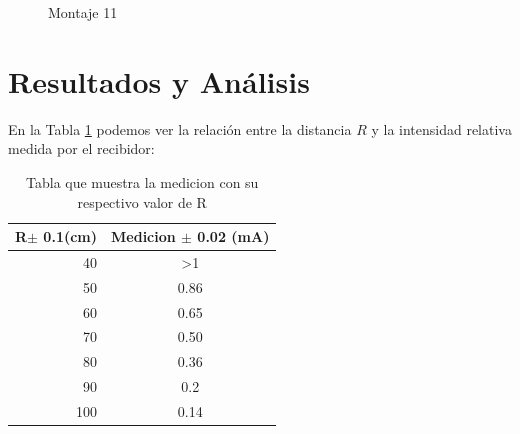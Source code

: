 \documentclass[aps,prl,reprint]{revtex4-1}
\begin{document}
\begin{figure}[H]
\begin{center}
 \caption{Montaje 11}
 \label{exp11}
 \end{center}
\end{figure}

\section{Resultados y An\'alisis}
En la Tabla \ref{tbmonta1.1} podemos ver la relación entre la distancia $R$ y la intensidad relativa medida por el recibidor:\\

\begin{table}[H]
\begin{center}

\begin{tabular}{|| r || c ||} 
\hline\hline
R$\pm$ 0.1(cm)  & Medicion $\pm$ 0.02 (mA) \\ \hline
40             & \textgreater 1        \\ \hline
50             & 0.86              \\ \hline
60             & 0.65              \\ \hline
70             & 0.50              \\ \hline
80             & 0.36              \\ \hline
90             & 0.2               \\ \hline
100            & 0.14              \\ \hline

\end{tabular}
\end{center}
\caption{Tabla que muestra la medicion con su respectivo valor de R}
\label{tbmonta1.1}
\end{table}
\end{document}

